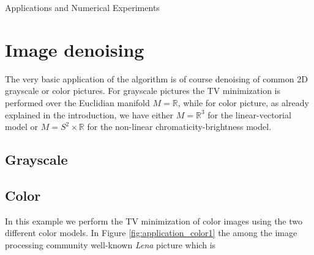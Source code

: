 \begin{chapter}{Applications and Numerical Experiments}
\label{ch:numericalexperiments}

\section{Image denoising} %
\label{sec:image denoising}
The very basic application of the algorithm is of course denoising of common 2D grayscale or color pictures.
For grayscale pictures the TV minimization is performed over the Euclidian manifold $M=\mathbb{R}$, while for color
picture, as already explained in the introduction, we have either $M=\mathbb{R}^3$ for the linear-vectorial model or
$M=S^2\times\mathbb{R}$ for the non-linear chromaticity-brightness model.

\subsection{Grayscale} %
\label{sub:Grayscale}

\FloatBarrier
\subsection{Color} %
\label{sub:Color}
In this example we perform the TV minimization of color images using the two different color models. In Figure \ref{fig:application_color1}
the among the image processing community well-known \emph{Lena} picture which is 



\end{chapter}
